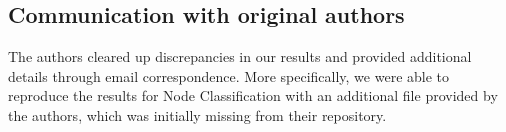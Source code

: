 


\subsection{Communication with original authors}
The authors cleared up discrepancies in our results and provided additional details through email correspondence. More specifically, we were able to reproduce the results for Node Classification with an additional file provided by the authors, which was initially missing from their repository. 

\newpage



